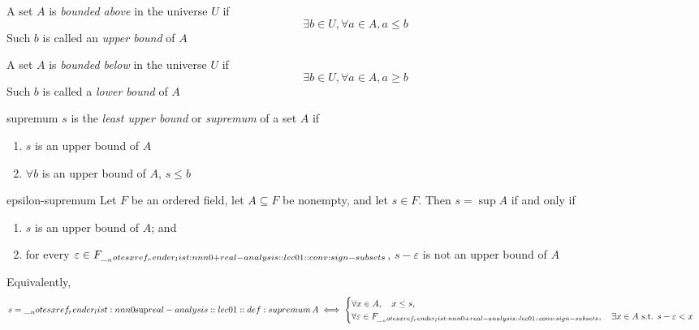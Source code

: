 \documentclass[12pt]{article}
\begin{document}
\begin{dfn}
  A set \(A\) is \emph{bounded above} in the universe $U$ if \[\exists b \in U, \forall a \in A, a \leq b\]  
  Such $b$ is called an \emph{upper bound} of \(A\)
\end{dfn} 

\begin{dfn}
  A set \(A\) is \emph{bounded below} in the universe $U$ if \[\exists b \in U, \forall a \in A, a \geq b\] 
  Such $b$ is called a \emph{lower bound} of \(A\)
\end{dfn} 

\begin{dfn}{supremum} 
  $s$ is the \emph{least upper bound} or \emph{supremum} of a set \(A\) if 
  \begin{enumerate}[nosep]
    \item $s$ is an upper bound of \(A\)
    \item $\forall b$ is an upper bound of \(A\), $s \leq b$ 
  \end{enumerate}
  \par\smallskip{}
\end{dfn} 

\begin{prop}
{epsilon-supremum}
  Let \(F\) be an ordered field, let \(A\subseteq F\) be nonempty, and
  let \(s\in F\).
  Then \(s=\sup A\) if and only if
  \begin{enumerate}[nosep]
    \item \(s\) is an upper bound of \(A\); and
    \item for every \(\varepsilon\in\apos{F}\),
      \(s-\varepsilon\) is not an upper bound of \(A\)
  \end{enumerate}
  Equivalently,
  \[
    s=\sup A
    \iff
    \begin{cases}
      \forall x\in A,\quad x\leq s,\\
      \forall\varepsilon\in\apos{F},\quad
      \exists x\in A\text{ s.t. }s-\varepsilon<x
    \end{cases}
  \]
\end{prop} 
\end{document}
